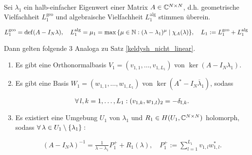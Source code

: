 \begin{theorem} \label{keldysh_linear}
    
    Sei $\lambda_1$ ein halb-einfacher Eigenwert einer Matrix $A \in \mathbb{C}^{N \times N}$, d.h. geometrische Vielfachheit $L_1^\mathrm{geo}$ und algebraische Vielfachheit $L_1^\mathrm{alg}$ stimmen überein.

    \begin{align*}
        L_1^\mathrm{geo} = \operatorname{def}(A - I_N \lambda),
        \quad
        L_1^\mathrm{alg} = \mu_1 = \max {\left \{ \mu \in \mathbb{N}: (\lambda - \lambda_1)^\mu \mid \chi_A(\lambda) \right \}},
        \quad
        L_1 := L_1^\mathrm{geo} + L_1^\mathrm{alg}
    \end{align*}

    Dann gelten folgende $3$ Analoga zu Satz \ref{keldysh_nicht_linear}.

    \begin{enumerate}[label = (\roman*)]

        \item Es gibt eine Orthonormalbasis $V_1 = (v_{1, 1}, \dots, v_{1, L_1})$ von $\ker (A - I_N \lambda_1)$.

        \item Es gibt eine Basis $W_1 = (w_{1, 1}, \dots, w_{1, L_1})$ von $\ker (A^\ast - I_N \overline \lambda_1)$, sodass
        
        \begin{align*}
            \forall \, l, k = 1, \dots, L_1:
            (v_{1, k}, w_{1, l})_2 = -\delta_{l, k}.
        \end{align*}

        \item Es existiert eine Umgebung $U_1$ von $\lambda_1$ und $R_1 \in H(U_1, \mathbb{C}^{N \times N})$ holomorph, sodass $\forall \, \lambda \in U_1 \setminus {\left \{ \lambda_1 \right \}}:$

        \begin{align*}
            (A - I_N \lambda)^{-1}
            =
            \frac{1}{\lambda - \lambda_1} P_1^+
            +
            R_1(\lambda),
            \quad
            P_1^+
            :=
            \sum_{l=1}^{L_1}
                v_{1, l} w_{1, l}^\ast.
        \end{align*}

    \end{enumerate}

\end{theorem}
